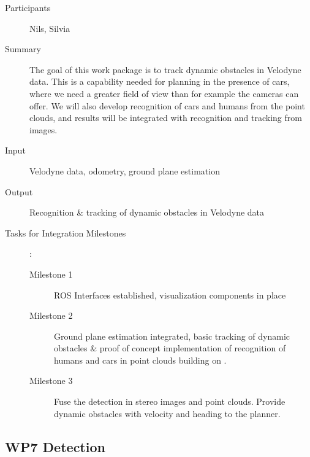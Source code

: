 \documentclass[11pt,a4paper]{article}
\begin{document}
\begin{description}
\item[Participants] Nils, Silvia
\item[Summary] The goal of this work package is to track dynamic obstacles in Velodyne data.
			   This is a capability needed for planning in the presence of cars, where we
			   need a greater field of view than for example the cameras can offer.
			   We will also develop recognition of cars and humans from the point clouds,
			   and results will be integrated with recognition and tracking from images.
\item[Input] Velodyne data, odometry, ground plane estimation
\item[Output] Recognition \& tracking of dynamic obstacles in Velodyne data
\item[Tasks for Integration Milestones]:\
	\begin{description}
		\item[Milestone 1] ROS Interfaces established, visualization components in place
		\item[Milestone 2] Ground plane estimation integrated, basic tracking of dynamic obstacles \&
						   proof of concept implementation of recognition of humans and cars in point clouds building on \cite{}.
		\item[Milestone 3] Fuse the detection in stereo images and point clouds. Provide dynamic obstacles
						   with velocity and heading to the planner.
	\end{description}	 
\end{description}

\subsection{WP7 Detection} %
\end{document}
